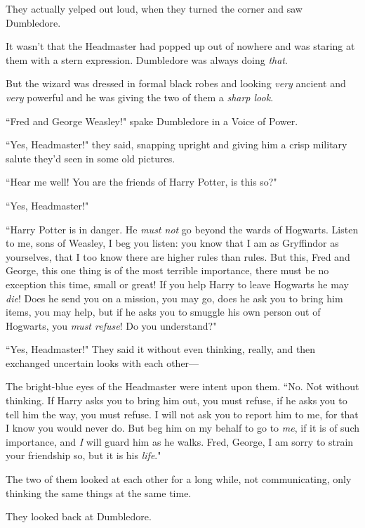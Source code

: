 
They actually yelped out loud, when they turned the corner and saw Dumbledore.

It wasn't that the Headmaster had popped up out of nowhere and was staring at them with a stern expression. Dumbledore was always doing \emph{that}.

But the wizard was dressed in formal black robes and looking \emph{very} ancient and \emph{very} powerful and he was giving the two of them a \emph{sharp look}.

``Fred and George Weasley!" spake Dumbledore in a Voice of Power.

``Yes, Headmaster!" they said, snapping upright and giving him a crisp military salute they'd seen in some old pictures.

``Hear me well! You are the friends of Harry Potter, is this so?"

``Yes, Headmaster!"

``Harry Potter is in danger. He \emph{must not} go beyond the wards of Hogwarts. Listen to me, sons of Weasley, I beg you listen: you know that I am as Gryffindor as yourselves, that I too know there are higher rules than rules. But this, Fred and George, this one thing is of the most terrible importance, there must be no exception this time, small or great! If you help Harry to leave Hogwarts he may \emph{die}! Does he send you on a mission, you may go, does he ask you to bring him items, you may help, but if he asks you to smuggle his own person out of Hogwarts, you \emph{must refuse}! Do you understand?"

``Yes, Headmaster!" They said it without even thinking, really, and then exchanged uncertain looks with each other---

The bright-blue eyes of the Headmaster were intent upon them. ``No. Not without thinking. If Harry asks you to bring him out, you must refuse, if he asks you to tell him the way, you must refuse. I will not ask you to report him to me, for that I know you would never do. But beg him on my behalf to go to \emph{me}, if it is of such importance, and \emph{I} will guard him as he walks. Fred, George, I am sorry to strain your friendship so, but it is his \emph{life}."

The two of them looked at each other for a long while, not communicating, only thinking the same things at the same time.

They looked back at Dumbledore.

